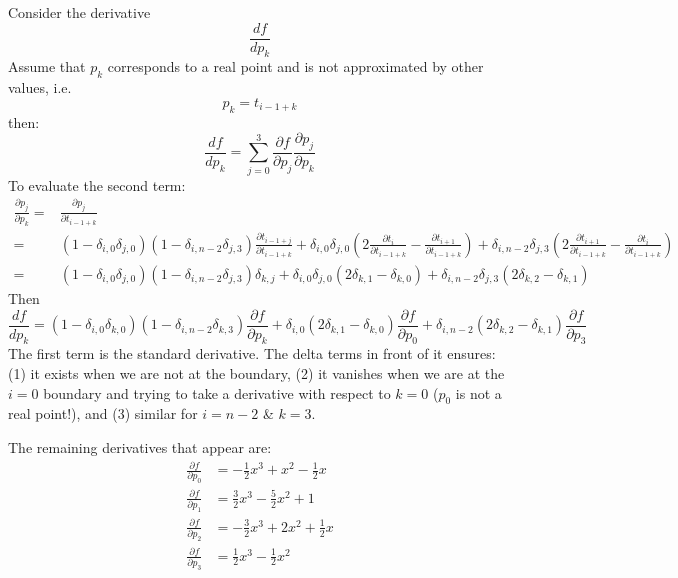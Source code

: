 \documentclass[11pt]{article}
\begin{document}
Consider the derivative
\begin{equation}
\frac{d f}{d p_k}
\end{equation}
Assume that $p_k$ corresponds to a real point and is not approximated by other values, i.e.
\begin{equation}
p_k = t_{i-1+k}
\end{equation}
then:
\begin{equation}
\frac{d f}{d p_k}
=
\sum_{j = 0}^3 \frac{\partial f}{\partial p_j} \frac{\partial p_j}{\partial p_k}
\end{equation}
To evaluate the second term:
\begin{equation}
\begin{split}
\frac{\partial p_j}{\partial p_k} 
=& 
\frac{\partial p_j}{\partial t_{i-1+k}} \\
=& 
(1 - \delta_{i,0} \delta_{j,0} ) (1-\delta_{i,n-2} \delta_{j,3} ) \frac{\partial t_{i-1+j}}{\partial t_{i-1+k}}
+
\delta_{i,0} \delta_{j,0} ( 2 \frac{\partial t_i}{\partial t_{i-1+k}} - \frac{\partial t_{i+1}}{\partial t_{i-1+k}} )
+ \delta_{i,n-2} \delta_{j,3} ( 2 \frac{\partial t_{i+1}}{\partial t_{i-1+k}} - \frac{\partial t_i}{\partial t_{i-1+k}} ) \\
=& 
(1 - \delta_{i,0} \delta_{j,0} ) (1-\delta_{i,n-2} \delta_{j,3} ) \delta_{k,j}
+
\delta_{i,0} \delta_{j,0} ( 2 \delta_{k,1} - \delta_{k,0} )
+ \delta_{i,n-2} \delta_{j,3} ( 2 \delta_{k,2} - \delta_{k,1} )
\end{split}
\end{equation}
Then
\begin{equation}
\frac{d f}{d p_k}
=
(1 - \delta_{i,0} \delta_{k,0} ) (1-\delta_{i,n-2} \delta_{k,3} ) \frac{\partial f}{\partial p_k}
+
\delta_{i,0} (2 \delta_{k,1} - \delta_{k,0} ) \frac{\partial f}{\partial p_0}
+
\delta_{i,n-2} (2 \delta_{k,2} - \delta_{k,1} ) \frac{\partial f}{\partial p_3}
\end{equation}
The first term is the standard derivative. The delta terms in front of it ensures: (1) it exists when we are not at the boundary, (2) it vanishes when we are at the $i=0$ boundary and trying to take a derivative with respect to $k=0$ ($p_0$ is not a real point!), and (3) similar for $i=n-2$ \& $k=3$.

The remaining derivatives that appear are:
\begin{equation}
\begin{split}
\frac{\partial f}{\partial p_0} &= - \frac{1}{2} x^3 + x^2 - \frac{1}{2} x \\
\frac{\partial f}{\partial p_1} &= \frac{3}{2} x^3 - \frac{5}{2} x^2 + 1 \\
\frac{\partial f}{\partial p_2} &= - \frac{3}{2} x^3 + 2 x^2 + \frac{1}{2} x \\
\frac{\partial f}{\partial p_3} &= \frac{1}{2} x^3 - \frac{1}{2} x^2
\end{split}
\label{eq:derivValue}
\end{equation}
\end{document}

